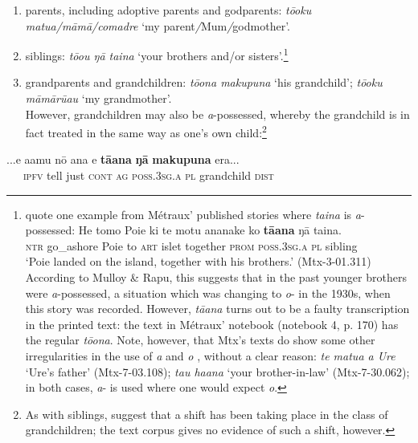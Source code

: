 \begin{enumerate}
\item 
parents, including adoptive parents and godparents: \textit{tō{\ꞌ}oku matu{\ꞌ}a/māmā/comadre} ‘my parent\textit{/}Mum\textit{/}godmother’.

\item 
siblings: \textit{tō{\ꞌ}ou ŋā taina} ‘your brothers and/or sisters’.\footnote{\label{fn:297}\citet[22]{MulloyRapu1977} quote one example from Métraux’ published stories where \textit{taina} is \textit{a}{}-possessed:
\ea
\gll  He tomo Poie ki te motu ananake ko \textbf{tā{\ꞌ}ana} ŋā taina.\\
  \textsc{ntr} go\_ashore Poie to \textsc{art} islet together \textsc{prom} \textsc{poss.3sg.a} \textsc{pl} sibling \\
  \glt 
  ‘Poie landed on the island, together with his brothers.’ (Mtx-3-01.311) \z
According to Mulloy \& Rapu, this suggests that in the past younger brothers were \textit{a}{}-possessed, a situation which was changing to \textit{o}{}- in the 1930s, when this story was recorded. However, \textit{tā{\ꞌ}ana} turns out to be a faulty transcription in the printed text: the text in Métraux’ notebook (notebook 4, p. 170) has the regular \textit{tō{\ꞌ}ona}. 
Note, however, that Mtx’s texts do show some other irregularities in the use of \textit{{\ꞌ}a} and \textit{o} , without a clear reason: \textit{te matu{\ꞌ}a {\ꞌ}a Ure} ‘Ure’s father’ (Mtx-7-03.108); \textit{ta{\ꞌ}u ha{\ꞌ}ana} ‘your brother-in-law’ (Mtx-7-30.062); in both cases, \textit{a}{}- is used where one would expect \textit{o}.}

\item 
grandparents and grandchildren: \textit{tō{\ꞌ}ona makupuna} ‘his grandchild’; \textit{tō{\ꞌ}oku māmā\-rū{\ꞌ}au} ‘my grandmother’.\\
However, grandchildren may also be \textit{a}{}-possessed, whereby the grandchild is in fact treated in the same way as one’s own child:\footnote{\label{fn:298}As with siblings, \citet[22]{MulloyRapu1977} suggest that a shift has been taking place in the  class of grandchildren; the text corpus gives no evidence of such a shift, however.}

\end{enumerate}

\ea\label{ex:6.60}
\gll ...e {\ꞌ}a{\ꞌ}amu nō {\ꞌ}ana e \textbf{tā{\ꞌ}ana} \textbf{ŋā} \textbf{makupuna} era... \\
~~~\textsc{ipfv} tell just \textsc{cont} \textsc{ag} \textsc{poss.3sg.a}\textsc{} \textsc{pl} grandchild \textsc{dist} \\

